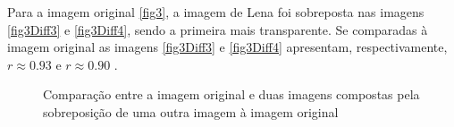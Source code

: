 \documentclass[10pt,a4paper]{article}
\begin{document}
\vspace{-0.5cm}
Para a imagem original \ref{fig3}, a imagem de Lena foi sobreposta nas
imagens \ref{fig3Diff3} e \ref{fig3Diff4}, sendo a primeira mais
transparente.
Se comparadas à imagem original as imagens \ref{fig3Diff3} e
\ref{fig3Diff4} apresentam, respectivamente, $r\approx 0.93$ e
$r\approx 0.90$ . 
\begin{figure}[h!]
\begin{center}
\hspace{10mm}
\caption{Comparação entre a imagem original e duas imagens compostas pela sobreposição
  de uma outra imagem à imagem original}
\end{center}
\end{figure}
\end{document}

